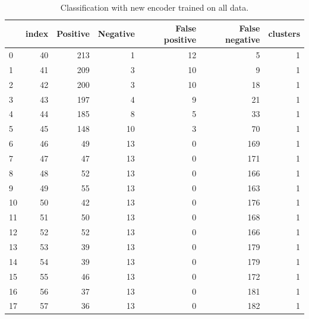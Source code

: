 \documentclass[a4paper,twoside,12pt]{book}
\begin{document}
\begin{appendices}
\begin{table}
	\centering
	\caption{Classification with new encoder trained on all data.}
	\label{id:tab:SVMencWoLab}
	\begin{tabular}{lrrrrrr}
		\toprule
		{} &  index &  Positive &  Negative &  False positive &  False negative &  clusters \\
		\midrule
		0   &     40 &       213 &         1 &              12 &               5 &         1 \\
		1   &     41 &       209 &         3 &              10 &               9 &         1 \\
		2   &     42 &       200 &         3 &              10 &              18 &         1 \\
		3   &     43 &       197 &         4 &               9 &              21 &         1 \\
		4   &     44 &       185 &         8 &               5 &              33 &         1 \\
		5   &     45 &       148 &        10 &               3 &              70 &         1 \\
		6   &     46 &        49 &        13 &               0 &             169 &         1 \\
		7   &     47 &        47 &        13 &               0 &             171 &         1 \\
		8   &     48 &        52 &        13 &               0 &             166 &         1 \\
		9   &     49 &        55 &        13 &               0 &             163 &         1 \\
		10  &     50 &        42 &        13 &               0 &             176 &         1 \\
		11  &     51 &        50 &        13 &               0 &             168 &         1 \\
		12  &     52 &        52 &        13 &               0 &             166 &         1 \\
		13  &     53 &        39 &        13 &               0 &             179 &         1 \\
		14  &     54 &        39 &        13 &               0 &             179 &         1 \\
		15  &     55 &        46 &        13 &               0 &             172 &         1 \\
		16  &     56 &        37 &        13 &               0 &             181 &         1 \\
		17  &     57 &        36 &        13 &               0 &             182 &         1 \\

\end{tabular}
\end{table}
\end{appendices}
\end{document}
